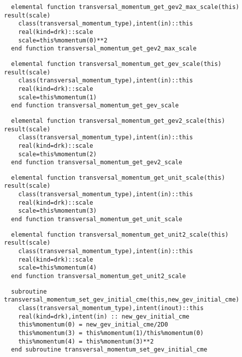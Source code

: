 \begin{Verbatim}
  elemental function transversal_momentum_get_gev2_max_scale(this) result(scale)
    class(transversal_momentum_type),intent(in)::this
    real(kind=drk)::scale
    scale=this%momentum(0)**2
  end function transversal_momentum_get_gev2_max_scale
\end{Verbatim}

\begin{Verbatim}
  elemental function transversal_momentum_get_gev_scale(this) result(scale)
    class(transversal_momentum_type),intent(in)::this
    real(kind=drk)::scale
    scale=this%momentum(1)
  end function transversal_momentum_get_gev_scale
\end{Verbatim}

\begin{Verbatim}
  elemental function transversal_momentum_get_gev2_scale(this) result(scale)
    class(transversal_momentum_type),intent(in)::this
    real(kind=drk)::scale
    scale=this%momentum(2)
  end function transversal_momentum_get_gev2_scale
\end{Verbatim}

\begin{Verbatim}
  elemental function transversal_momentum_get_unit_scale(this) result(scale)
    class(transversal_momentum_type),intent(in)::this
    real(kind=drk)::scale
    scale=this%momentum(3)
  end function transversal_momentum_get_unit_scale
\end{Verbatim}

\begin{Verbatim}
  elemental function transversal_momentum_get_unit2_scale(this) result(scale)
    class(transversal_momentum_type),intent(in)::this
    real(kind=drk)::scale
    scale=this%momentum(4)
  end function transversal_momentum_get_unit2_scale
\end{Verbatim}

\begin{Verbatim}
  subroutine transversal_momentum_set_gev_initial_cme(this,new_gev_initial_cme)
    class(transversal_momentum_type),intent(inout)::this
    real(kind=drk),intent(in) :: new_gev_initial_cme
    this%momentum(0) = new_gev_initial_cme/2D0
    this%momentum(3) = this%momentum(1)/this%momentum(0)
    this%momentum(4) = this%momentum(3)**2
  end subroutine transversal_momentum_set_gev_initial_cme
\end{Verbatim}

